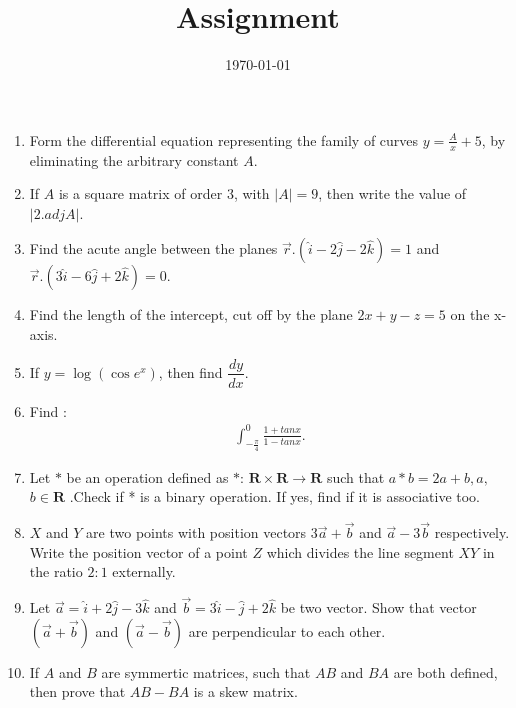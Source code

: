 \documentclass[12pt,-letter paper]{article}
\title{Assignment}
\date{\today}
\providecommand{\brak}[1]{\ensuremath{\left(#1\right)}}
\providecommand{\abs}[1]{\left\vert#1\right\vert}
\begin{document}

\begin{enumerate}
	\item Form the differential equation representing the family of curves $y=\frac{A}{x}+5$, by eliminating the arbitrary constant $A$.

     \item If $A$ is a square matrix of order $3$, with $\abs{A} = 9$, then write the value of $\abs{2.adj A}$.

     \item Find the acute angle between the planes $\overrightarrow{r}.\brak{\hat{i}-2\hat{j}-2\hat{k}}=1$ and $\overrightarrow{r}.\brak{3\hat{i}-6\hat{j}+2\hat{k}}=0$.
     
     \item Find the length of the intercept, cut off by the plane $2x+y-z=5$ on the x-axis.
     
     \item If $y=\log(\cos{e^x})$, then find $\dfrac{dy}{dx}$.

     \item Find :
        \begin{align*}
         \int_{-\frac{\pi}{4}}^{0}  \frac{1+tan x}{1- tan x}.
        \end{align*}

    \item Let $*$ be an operation defined as $*$:   $\textbf{R}\times\textbf{R}\rightarrow \textbf{R} $ such that $a * b = 2a + b, a,$ $b\in \textbf{R} $ .Check if * is a binary operation. If yes, find if it is associative too.

    \item $X$ and $Y$ are two points with position vectors $3\overrightarrow{a}+\overrightarrow{b}$ and $\overrightarrow{a}-3\overrightarrow{b}$ respectively. Write the position vector of a point $Z$ which divides the line segment $XY$ in the ratio $2:1$ externally.

    \item Let $\overrightarrow{a}=\hat{i}+2\hat{j}-3\hat{k}$ and $\overrightarrow{b}=3\hat{i}-\hat{j}+2\hat{k}$ be two vector. Show that vector $\brak{\overrightarrow{a}+\overrightarrow{b}}$ and $\brak{\overrightarrow{a}-\overrightarrow{b}}$ are perpendicular to each other. 
    
    \item If $A$ and $B$ are symmertic matrices, such that $AB$ and $BA$ are both defined, then prove that $AB-BA$ is a skew matrix.


\end{enumerate}
\end{document}
